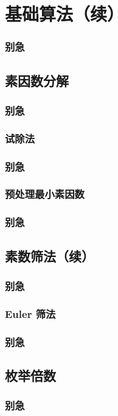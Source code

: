 
\section{基础算法（续）}
\begin{frame} %
  \frametitle{别急}
\end{frame}
\subsection{素因数分解}
\begin{frame}[c]
  \progressnow*
\end{frame}
\begin{frame} %
  \frametitle{别急}
\end{frame}
\subsubsection{试除法}
\begin{frame}[c]
  \progressnow
\end{frame}
\begin{frame} %
  \frametitle{别急}
\end{frame}
\subsubsection{预处理最小素因数}
\begin{frame}[c]
  \progressnow
\end{frame}
\begin{frame} %
  \frametitle{别急}
\end{frame}
\subsection{素数筛法（续）}
\begin{frame}[c]
  \progressnow*
\end{frame}
\begin{frame} %
  \frametitle{别急}
\end{frame}
\subsubsection{Euler 筛法}
\begin{frame}[c]
  \progressnow
\end{frame}
\begin{frame} %
  \frametitle{别急}
\end{frame}
\subsection{枚举倍数}
\begin{frame}[c]
  \progressnow*
\end{frame}
\begin{frame} %
  \frametitle{别急}
\end{frame}

